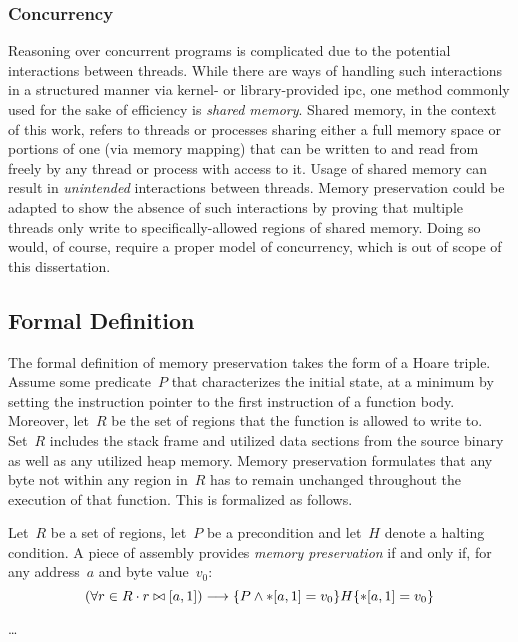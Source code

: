 \subsubsection{Concurrency}
Reasoning over concurrent programs is complicated
due to the potential interactions between threads.
While there are ways of handling such interactions in a structured manner
via kernel- or library-provided \ac{ipc},
one method commonly used for the sake of efficiency is \emph{shared memory}.
Shared memory, in the context of this work,
refers to threads or processes sharing either a full memory space
or portions of one (via memory mapping)
that can be written to and read from freely by any thread or process with access to it.
Usage of shared memory can result in \emph{unintended} interactions between threads.
Memory preservation could be adapted to show the absence of such interactions
by proving that multiple threads only write
to specifically-allowed regions of shared memory.
Doing so would, of course, require a proper model of concurrency,
which is out of scope of this dissertation.

\subsection{Formal Definition}
The formal definition of memory preservation takes the form of a Hoare triple.
Assume some predicate~$P$ that characterizes the initial state, at a minimum
by setting the instruction pointer to the first instruction of a function body.
Moreover, let~$R$ be the set of regions that the function is allowed to write to.
Set~$R$ includes the stack frame and utilized data sections from the source binary
as well as any utilized heap memory.
Memory preservation formulates that any byte not within any region in~$R$ has to remain unchanged throughout the execution of that function.
This is formalized as follows.
\begin{definition}
  Let~$R$ be a set of regions, let~$P$ be a precondition and let~$H$ denote a halting condition.
  A piece of assembly provides \emph{memory preservation} if and only if, for any address~$a$ and byte value~$v_0$:
  \begin{equation}
  (\forall r\in R\cdot r\bowtie[a,1])\longrightarrow\{P\wedge \ast[a,1]=v_0\}H\{\ast[a,1]=v_0\}
  \end{equation}
\end{definition}


\todo\dots

